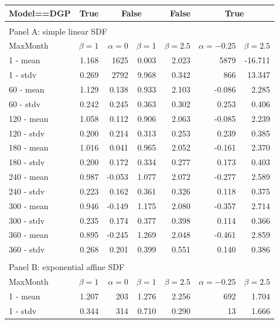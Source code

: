 \documentclass[12pt]{article}
\begin{document}
\begin{table}[ht]
	\centering
	\begin{tabular}{lrrrrrr}
		Model==DGP & True & \multicolumn{2}{c}{False} & False & \multicolumn{2}{c}{True} \\
		\hline
		\hline
		\multicolumn{7}{l}{} \\
		\multicolumn{7}{l}{Panel A: simple linear SDF} \\
		MaxMonth & $\beta=1$ & $\alpha=0$ & $\beta=1$ & $\beta=2.5$ & $\alpha=-0.25$ & $\beta=2.5$ \\ 
		\hline
		\hline
		1 - mean & 1.168 & 1625 & 0.003 & 2.023 & 5879 & -16.711 \\ 
		1 - stdv & 0.269 & 2792 & 9.968 & 0.342 & 866 & 13.347 \\ 
		\hline
		60 - mean & 1.129 & 0.138 & 0.933 & 2.103 & -0.086 & 2.285 \\ 
		60 - stdv & 0.242 & 0.245 & 0.363 & 0.302 & 0.253 & 0.406 \\ 
		\hline
		120 - mean & 1.058 & 0.112 & 0.906 & 2.063 & -0.085 & 2.239 \\ 
		120 - stdv & 0.200 & 0.214 & 0.313 & 0.253 & 0.239 & 0.385 \\ 
		\hline
		180 - mean & 1.016 & 0.041 & 0.965 & 2.052 & -0.161 & 2.370 \\ 
		180 - stdv & 0.200 & 0.172 & 0.334 & 0.277 & 0.173 & 0.403 \\ 
		\hline
		240 - mean & 0.987 & -0.053 & 1.077 & 2.072 & -0.277 & 2.589 \\ 
		240 - stdv & 0.223 & 0.162 & 0.361 & 0.326 & 0.118 & 0.375 \\
		\hline 
		300 - mean & 0.946 & -0.149 & 1.175 & 2.080 & -0.357 & 2.714 \\ 
		300 - stdv & 0.235 & 0.174 & 0.377 & 0.398 & 0.114 & 0.366 \\ 
		\hline
		360 - mean & 0.895 & -0.245 & 1.269 & 2.048 & -0.461 & 2.859 \\ 
		360 - stdv & 0.268 & 0.201 & 0.399 & 0.551 & 0.140 & 0.386 \\ 
		\hline
		\hline
		\multicolumn{7}{l}{} \\
		\multicolumn{7}{l}{Panel B: exponential affine SDF} \\
		MaxMonth & $\beta=1$ & $\alpha=0$ & $\beta=1$ & $\beta=2.5$ & $\alpha=-0.25$ & $\beta=2.5$ \\ 
		\hline
		\hline
		1 - mean & 1.207 & 203 & 1.276 & 2.256 & 692 & 1.704 \\ 
		1 - stdv & 0.344 & 314 & 0.710 & 0.290 & 13 & 1.666 \\ 

\end{tabular}
\end{table}
\end{document}
